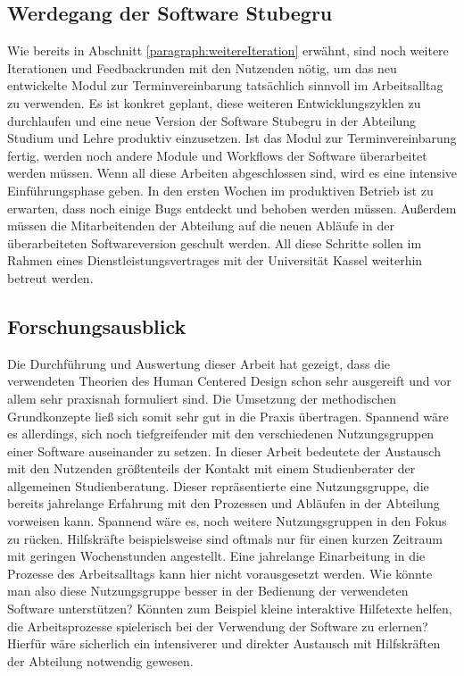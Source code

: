 \subsection*{Werdegang der Software Stubegru}
Wie bereits in Abschnitt \ref{paragraph:weitereIteration} erwähnt, sind noch
weitere Iterationen und Feedbackrunden mit den Nutzenden nötig, um das neu
entwickelte Modul zur Terminvereinbarung tatsächlich sinnvoll im Arbeitsalltag
zu verwenden. Es ist konkret geplant, diese weiteren Entwicklungszyklen zu
durchlaufen und eine neue Version der Software Stubegru in der Abteilung
Studium und Lehre produktiv einzusetzen. Ist das Modul zur Terminvereinbarung
fertig, werden noch andere Module und Workflows der Software überarbeitet
werden müssen. Wenn all diese Arbeiten abgeschlossen sind, wird es eine
intensive Einführungsphase geben. In den ersten Wochen im produktiven Betrieb
ist zu erwarten, dass noch einige Bugs entdeckt und behoben werden müssen.
Außerdem müssen die Mitarbeitenden der Abteilung auf die neuen Abläufe in der
überarbeiteten Softwareversion geschult werden. All diese Schritte sollen im
Rahmen eines Dienstleistungsvertrages mit der Universität Kassel weiterhin
betreut werden.

\subsection*{Forschungsausblick}
Die Durchführung und Auswertung dieser Arbeit hat gezeigt, dass die verwendeten
Theorien des Human Centered Design schon sehr ausgereift und vor allem sehr
praxisnah formuliert sind. Die Umsetzung der methodischen Grundkonzepte ließ
sich somit sehr gut in die Praxis übertragen. Spannend wäre es allerdings, sich
noch tiefgreifender mit den verschiedenen Nutzungsgruppen einer Software
auseinander zu setzen. In dieser Arbeit bedeutete der Austausch mit den
Nutzenden größtenteils der Kontakt mit einem Studienberater der allgemeinen
Studienberatung. Dieser repräsentierte eine Nutzungsgruppe, die bereits
jahrelange Erfahrung mit den Prozessen und Abläufen in der Abteilung vorweisen
kann. Spannend wäre es, noch weitere Nutzungsgruppen in den Fokus zu rücken.
Hilfskräfte beispielsweise sind oftmals nur für einen kurzen Zeitraum mit
geringen Wochenstunden angestellt. Eine jahrelange Einarbeitung in die Prozesse
des Arbeitsalltags kann hier nicht vorausgesetzt werden. Wie könnte man also
diese Nutzungsgruppe besser in der Bedienung der verwendeten Software
unterstützen? Könnten zum Beispiel kleine interaktive Hilfetexte helfen, die
Arbeitsprozesse spielerisch bei der Verwendung der Software zu erlernen?
Hierfür wäre sicherlich ein intensiverer und direkter Austausch mit
Hilfskräften der Abteilung notwendig gewesen.

